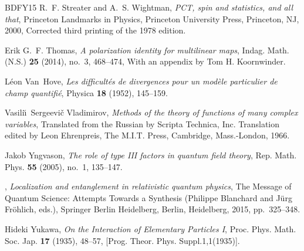 \documentclass[12pt,a4paper]{article}
\newcommand{\1}{\mathds{1}}                         %
\begin{document}
{\begin{thebibliography}{BDFY15}
		R.~F. Streater and A.~S. Wightman, \emph{P{CT}, spin and statistics, and all
			that}, Princeton Landmarks in Physics, Princeton University Press, Princeton,
		NJ, 2000, Corrected third printing of the 1978 edition. 
		
		Erik G.~F. Thomas, \emph{A polarization identity for multilinear maps}, Indag.
		Math. (N.S.) \textbf{25} (2014), no.~3, 468--474, With an appendix by Tom H.
		Koornwinder. 
		
		L\'{e}on Van~Hove, \emph{Les difficult\'{e}s de divergences pour un mod\`ele
			particulier de champ quantifi\'{e}}, Physica \textbf{18} (1952), 145--159.
		
		Vasili\u{\i}~Sergeevi\v{c} Vladimirov, \emph{Methods of the theory of functions
			of many complex variables}, Translated from the Russian by Scripta Technica,
		Inc. Translation edited by Leon Ehrenpreis, The M.I.T. Press, Cambridge,
		Mass.-London, 1966. 
		
		Jakob Yngvason, \emph{The role of type {III} factors in quantum field theory},
		Rep. Math. Phys. \textbf{55} (2005), no.~1, 135--147. 
		
		\bysame, \emph{Localization and entanglement in relativistic quantum physics},
		The Message of Quantum Science: Attempts Towards a Synthesis (Philippe
		Blanchard and J{\"u}rg Fr{\"o}hlich, eds.), Springer Berlin Heidelberg,
		Berlin, Heidelberg, 2015, pp.~325--348.
		
		Hideki Yukawa, \emph{{On the Interaction of Elementary Particles I}}, Proc.
		Phys. Math. Soc. Jap. \textbf{17} (1935), 48--57, [Prog. Theor. Phys.
		Suppl.1,1(1935)].
		
\end{thebibliography}}
\end{document}
